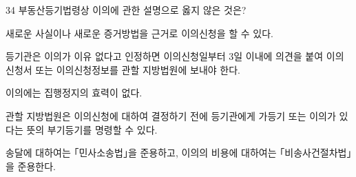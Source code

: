 \begin{question}{34}
부동산등기법령상 이의에 관한 설명으로 옳지 않은 것은?
\begin{choices}
  \item 새로운 사실이나 새로운 증거방법을 근거로 이의신청을 할 수 있다.
  \item 등기관은 이의가 이유 없다고 인정하면 이의신청일부터 3일 이내에 의견을 붙여 이의신청서 또는 이의신청정보를 관할 지방법원에 보내야 한다.
  \item 이의에는 집행정지의 효력이 없다.
  \item 관할 지방법원은 이의신청에 대하여 결정하기 전에 등기관에게 가등기 또는 이의가 있다는 뜻의 부기등기를 명령할 수 있다.
  \item 송달에 대하여는 ｢민사소송법｣을 준용하고, 이의의 비용에 대하여는 ｢비송사건절차법｣을 준용한다.
\end{choices}
\end{question}
